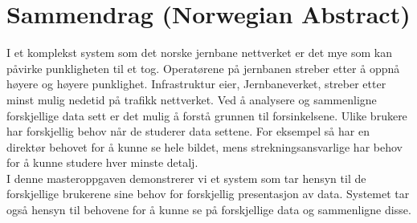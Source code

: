 \section*{Sammendrag (Norwegian Abstract)}

I et komplekst system som det norske jernbane nettverket er det mye som kan
påvirke punkligheten til et tog. Operatørene på jernbanen streber etter å oppnå
høyere og høyere punklighet. Infrastruktur eier, Jernbaneverket,  streber etter
minst mulig nedetid på trafikk nettverket.
Ved å analysere og sammenligne forskjellige data sett er det mulig å forstå 
grunnen til forsinkelsene.
Ulike brukere har forskjellig behov når de studerer data settene. For eksempel
så har en direktør behovet for å kunne se hele bildet, mens
strekningsansvarlige har behov for å kunne studere hver minste detalj.\\

I denne masteroppgaven demonstrerer vi et system som tar hensyn til de
forskjellige brukerene sine behov for forskjellig presentasjon av data.
Systemet tar også hensyn til behovene for å kunne se på forskjellige data
og sammenligne disse.
	
\clearpage
